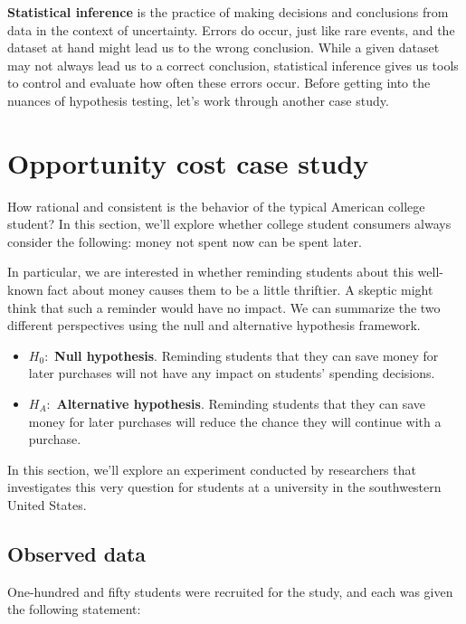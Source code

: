 \documentclass[
  10pt,
  openany]{book}
\providecommand{\tightlist}{%
  \setlength{\itemsep}{0pt}\setlength{\parskip}{0pt}}
\begin{document}
\textbf{Statistical inference} is the practice of making decisions and conclusions from data in the context of uncertainty.
Errors do occur, just like rare events, and the dataset at hand might lead us to the wrong conclusion.
While a given dataset may not always lead us to a correct conclusion, statistical inference gives us tools to control and evaluate how often these errors occur.
Before getting into the nuances of hypothesis testing, let's work through another case study.

\hypertarget{caseStudyOpportunityCost}{%
\section{Opportunity cost case study}\label{caseStudyOpportunityCost}}

How rational and consistent is the behavior of the typical American college student?
In this section, we'll explore whether college student consumers always consider the following: money not spent now can be spent later.

In particular, we are interested in whether reminding students about this well-known fact about money causes them to be a little thriftier.
A skeptic might think that such a reminder would have no impact.
We can summarize the two different perspectives using the null and alternative hypothesis framework.

\begin{itemize}
\tightlist
\item
  \(H_0:\) \textbf{Null hypothesis}. Reminding students that they can save money for later purchases will not have any impact on students' spending decisions.
\item
  \(H_A:\) \textbf{Alternative hypothesis}. Reminding students that they can save money for later purchases will reduce the chance they will continue with a purchase.
\end{itemize}

In this section, we'll explore an experiment conducted by researchers that investigates this very question for students at a university in the southwestern United States.
\citep{Frederick:2009}

\hypertarget{observed-data-1}{%
\subsection{Observed data}\label{observed-data-1}}

One-hundred and fifty students were recruited for the study, and each was given the following statement:
\end{document}
